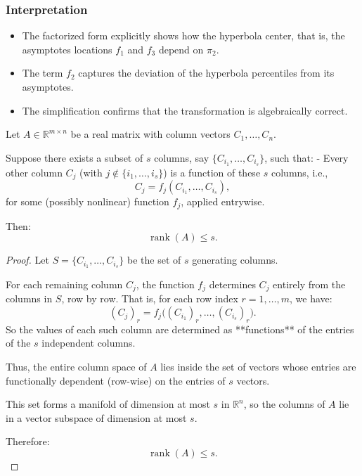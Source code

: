 \documentclass[
	11pt, %
	fleqn, %
	a4paper, %
]{LegrandOrangeBook}
\begin{document}
\subsubsection{Interpretation}
\begin{itemize}
\item The factorized form explicitly shows how the hyperbola center, that is, the asymptotes locations $f_1$ and $f_3$ depend on $\pi_2$.
\item The term $f_2$ captures the deviation of the hyperbola percentiles from its asymptotes.
\item The simplification confirms that the transformation is algebraically correct.
\end{itemize}

\begin{theorem}
Let $A \in \mathbb{R}^{m \times n}$ be a real matrix with column vectors $C_1, \dots, C_n$.

Suppose there exists a subset of $s$ columns, say $\{C_{i_1}, \dots, C_{i_s}\}$, such that:
- Every other column \( C_j \) (with \( j \notin \{i_1, \dots, i_s\} \)) is a function of these $s$ columns, i.e.,
\[
C_j = f_j(C_{i_1}, \dots, C_{i_s}),
\]
for some (possibly nonlinear) function \( f_j \), applied entrywise.

Then:
\[
\operatorname{rank}(A) \leq s.
\]
\end{theorem}
\begin{proof}
Let $S = \{C_{i_1}, \dots, C_{i_s}\}$ be the set of $s$ generating columns.

For each remaining column \( C_j \), the function \( f_j \) determines \( C_j \) entirely from the columns in \( S \), row by row. That is, for each row index \( r = 1, \dots, m \), we have:
\[
(C_j)_r = f_j\big((C_{i_1})_r, \dots, (C_{i_s})_r\big).
\]
So the values of each such column are determined as **functions** of the entries of the $s$ independent columns.

Thus, the entire column space of \( A \) lies inside the set of vectors whose entries are functionally dependent (row-wise) on the entries of \( s \) vectors.

This set forms a manifold of dimension at most \( s \) in \( \mathbb{R}^n \), so the columns of \( A \) lie in a vector subspace of dimension at most \( s \).

Therefore:
\[
\operatorname{rank}(A) \leq s.
\]
\end{proof}
\end{document}
